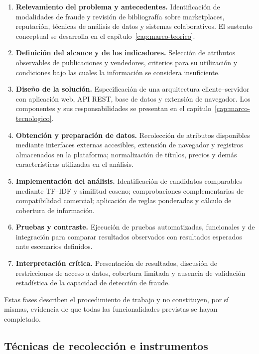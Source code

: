 \begin{enumerate}
    \item \textbf{Relevamiento del problema y antecedentes.} Identificación de modalidades de fraude y revisión de bibliografía sobre marketplaces, reputación, técnicas de análisis de datos y sistemas colaborativos. El sustento conceptual se desarrolla en el capítulo~\ref{cap:marco-teorico}.
    \item \textbf{Definición del alcance y de los indicadores.} Selección de atributos observables de publicaciones y vendedores, criterios para su utilización y condiciones bajo las cuales la información se considera insuficiente.
    \item \textbf{Diseño de la solución.} Especificación de una arquitectura cliente--servidor con aplicación web, API REST, base de datos y extensión de navegador. Los componentes y sus responsabilidades se presentan en el capítulo~\ref{cap:marco-tecnologico}.
    \item \textbf{Obtención y preparación de datos.} Recolección de atributos disponibles mediante interfaces externas accesibles, extensión de navegador y registros almacenados en la plataforma; normalización de títulos, precios y demás características utilizadas en el análisis.
    \item \textbf{Implementación del análisis.} Identificación de candidatos comparables mediante TF--IDF y similitud coseno; comprobaciones complementarias de compatibilidad comercial; aplicación de reglas ponderadas y cálculo de cobertura de información.
    \item \textbf{Pruebas y contraste.} Ejecución de pruebas automatizadas, funcionales y de integración para comparar resultados observados con resultados esperados ante escenarios definidos.
    \item \textbf{Interpretación crítica.} Presentación de resultados, discusión de restricciones de acceso a datos, cobertura limitada y ausencia de validación estadística de la capacidad de detección de fraude.
\end{enumerate}

Estas fases describen el procedimiento de trabajo y no constituyen, por sí mismas, evidencia de que todas las funcionalidades previstas se hayan completado.

\subsection{Técnicas de recolección e instrumentos}\label{subsec:ml-recoleccion}

